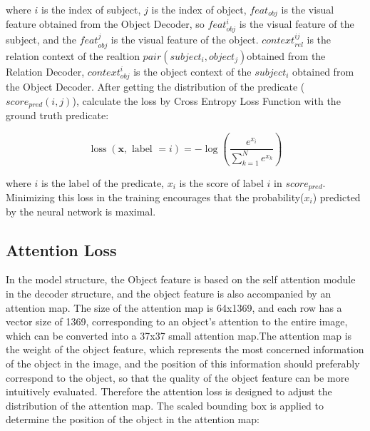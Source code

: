 where $ i $ is the index of subject, $ j $ is the index of object,  $ feat_{obj} $ is the visual feature obtained from the Object Decoder, so $ feat_{obj}^i $ is the visual feature of the subject, and the $ feat_{obj}^j $ is the visual feature of the object. $ context_{rel}^{ij} $ is the relation context of the realtion $ pair(subject_i,object_j)  $obtained from the Relation Decoder, $  context_{obj}^i $ is the object context of the $subject_i$ obtained from the Object Decoder. After getting the distribution of the predicate ($score_{pred}(i,j)$), calculate the loss by Cross Entropy Loss Function with the ground truth predicate:

$$
\operatorname{loss}(\boldsymbol{x}, \text { label }=i)=-\log \left(\frac{e^{x_{i}}}{\sum_{k=1}^{N} e^{x_{k}}}\right)
$$

where $ i $ is the label of the predicate,  $ x_i $ is the score of label $ i $ in  $ score_{pred} $. Minimizing this loss in the training encourages that the probability($ x_i $) predicted by the neural network is maximal.



\subsection{Attention Loss}

In the model structure, the Object feature is based on the self attention module in the decoder structure, and the object feature is also accompanied by an attention map. The size of the attention map is 64x1369, and each row has a vector size of 1369, corresponding to an object's attention to the entire image, which can be converted into a 37x37 small attention map.The attention map is the weight of the object feature, which represents the most concerned information of the object in the image, and the position of this information should preferably correspond to the object, so that the quality of the object feature can be more intuitively evaluated. Therefore the attention loss is designed to adjust the distribution of the attention map. The scaled bounding box is applied to determine the position of the object in the attention map:

